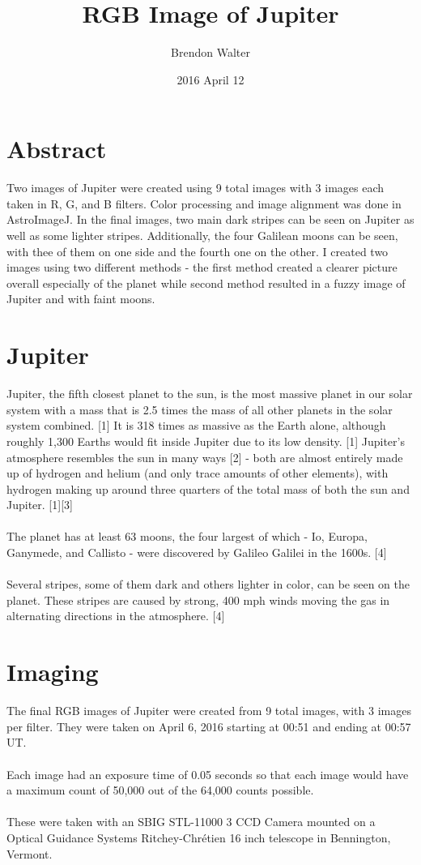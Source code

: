 \documentclass[12pt]{article}
\title{RGB Image of Jupiter}
\date{2016 April 12}
\author{Brendon Walter}
\begin{document}
	\maketitle
	
	\section{Abstract}
	
	Two images of Jupiter were created using 9 total images with 3 images each taken in R, G, and B filters. Color processing and image alignment was done in AstroImageJ. In the final images, two main dark stripes can be seen on Jupiter as well as some lighter stripes. Additionally, the four Galilean moons can be seen, with thee of them on one side and the fourth one on the other. I created two images using two different methods - the first method created a clearer picture overall especially of the planet while second method resulted in a fuzzy image of Jupiter and with faint moons.
	
	\section{Jupiter}
	Jupiter, the fifth closest planet to the sun, is the most massive planet in our solar system with a mass that is 2.5 times the mass of all other planets in the solar system combined. [1] It is 318 times as massive as the Earth alone, although roughly 1,300 Earths would fit inside Jupiter due to its low density. [1] Jupiter's atmosphere resembles the sun in many ways [2] - both are almost entirely made up of hydrogen and helium (and only trace amounts of other elements), with hydrogen making up around three quarters of the total mass of both the sun and Jupiter. [1][3]
	\\\\
	The planet has at least 63 moons, the four largest of which - Io, Europa, Ganymede, and Callisto - were discovered by Galileo Galilei in the 1600s. [4]
	\\\\
	Several stripes, some of them dark and others lighter in color, can be seen on the planet. These stripes are caused by strong, 400 mph winds moving the gas in alternating directions in the atmosphere. [4]
	
	\section{Imaging}
	The final RGB images of Jupiter were created from 9 total images, with 3 images per filter. They were taken on April 6, 2016 starting at 00:51 and ending at 00:57 UT.
	\\\\
	Each image had an exposure time of 0.05 seconds so that each image would have a maximum count of 50,000 out of the 64,000 counts possible.
	\\\\
	These were taken with an SBIG STL-11000 3 CCD Camera mounted on a Optical Guidance Systems Ritchey-Chrétien 16 inch telescope in Bennington, Vermont.
	
\end{document}

